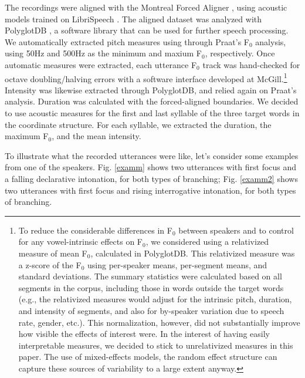 \documentclass[preprint,review,12pt,authoryear,times]{elsarticle}
\begin{document}
The recordings were aligned with the Montreal Forced Aligner \citep{mcauliffeetal17}, using acoustic models trained on LibriSpeech \citep{librispeech}. The aligned dataset was analyzed with PolyglotDB \citep{polyglotdb}, a software library that can be used for further speech processing. We automatically extracted pitch measures using through Praat's F$_0$ analysis, using 50Hz and 500Hz as the minimum and maxium F$_0$, respectively. Once automatic measures were extracted, each utterance F$_0$ track was hand-checked for octave doubling/halving errors with a software interface developed at McGill.\footnote{To reduce the considerable differences in F$_0$ between speakers and to control for any vowel-intrinsic effects on F$_0$, we considered using a relativized measure of mean F$_0$, calculated  in PolyglotDB.  This relativized measure was a z-score of the F$_0$ using per-speaker means, per-segment means, and standard deviations.  The summary statistics were calculated based on all segments in the corpus, including those in words outside the target words (e.g., the relativized measures would adjust for the intrinsic pitch, duration, and intensity of segments, and also for by-speaker variation due to speech rate, gender, etc.). This normalization, however, did not substantially improve how visible the effects of interest were. In the interest of having easily interpretable measures, we decided to stick to unrelativized measures in this paper. The use of mixed-effects models, the random effect structure can capture these sources of variability to a large extent anyway.}  Intensity was likewise extracted through PolyglotDB, and relied again on Praat's analysis. Duration was calculated with the forced-aligned boundaries.  We decided to use acoustic measures for the first and last syllable of the three target words in the coordinate structure. For each syllable, we extracted the duration, the maximum F$_0$, and the mean intensity. 

To illustrate what the recorded utterances were like, let's consider some examples from one of the speakers.  Fig. \ref{examm} shows two utterances with first focus and a falling declarative intonation, for both types of branching;  Fig. \ref{examm2}  shows two utterances with first focus and rising interrogative intonation, for both types of branching. 
\end{document}
